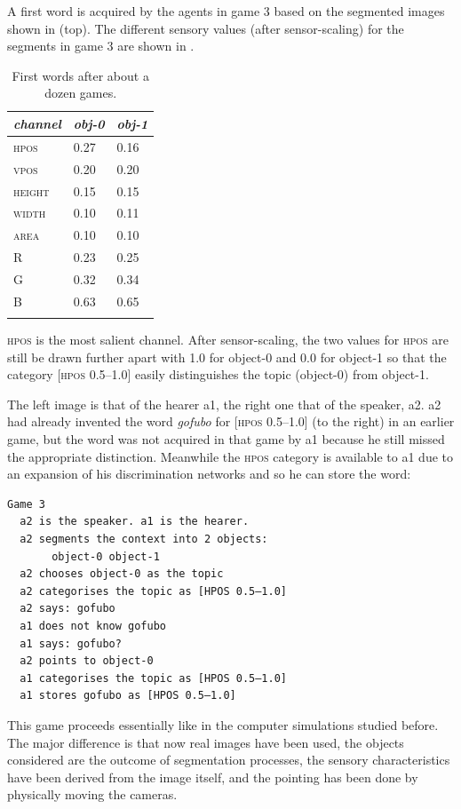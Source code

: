 A first word is acquired by the agents in game 3 
based on the segmented images shown in  (top).
The different sensory values (after sensor-scaling)
for the segments in game 3 are shown in . 


\begin{table}[b]
\begin{center}
\begin{tabular}{lll}
\lsptoprule
{\itshape channel}& {\itshape obj-0} & {\itshape obj-1}\\ \midrule
\textsc{hpos} & 0.27 & 0.16\\ 
\textsc{vpos} & 0.20 & 0.20\\ 
\textsc{height} & 0.15 & 0.15\\ 
\textsc{width} & 0.10 & 0.11\\ 
\textsc{area} & 0.10 & 0.10\\ 
R & 0.23 & 0.25\\ 
G & 0.32 & 0.34\\ 
B & 0.63 & 0.65\\ 
\lspbottomrule
\end{tabular}
\caption{\label{tab:game3b}First words after about a dozen games.}
\end{center}
\end{table}
\clearpage
\textsc{hpos} is the most salient channel. After sensor-scaling, 
the two values for \textsc{hpos} are still be drawn further
apart with 1.0 for object-0 and 
0.0 for object-1 so that the category [\textsc{hpos} 0.5–1.0] easily 
distinguishes the topic (object-0) from object-1.

The left image is that of the hearer {\bfshape a1}, the right one
that of the speaker, {\bfshape a2}.
{\bfshape a2} had already invented the word \textit{gofubo} for 
[\textsc{hpos} 0.5–1.0] (to the right) in an earlier game, 
but the word was not acquired in that game
by {\bfshape a1} because he still missed the 
appropriate distinction. Meanwhile the \textsc{hpos} category 
is available to {\bfshape a1} due to an
expansion of his discrimination networks
and so he can store the word: 
\begin{verbatim}
Game 3 
  a2 is the speaker. a1 is the hearer. 
  a2 segments the context into 2 objects: 
       object-0 object-1
  a2 chooses object-0 as the topic 
  a2 categorises the topic as [HPOS 0.5–1.0]
  a2 says: gofubo
  a1 does not know gofubo
  a1 says: gofubo?
  a2 points to object-0
  a1 categorises the topic as [HPOS 0.5–1.0]
  a1 stores gofubo as [HPOS 0.5–1.0]
\end{verbatim}
This game proceeds essentially like in the computer
simulations studied before. The major difference is
that now real images have been used, the objects
considered are the outcome of segmentation processes,
the sensory characteristics have been derived from the 
image itself, and the pointing has been done by 
physically moving the cameras. 

